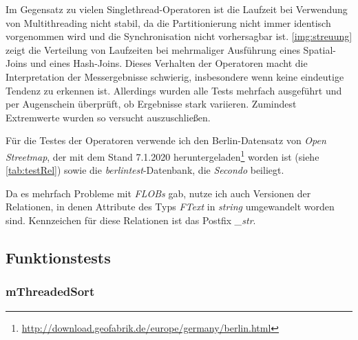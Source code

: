 \documentclass[a4paper,12pt,twoside]{article}
\newcommand{\Fb}[1]{\textit{#1}} %
\begin{document}
Im Gegensatz zu vielen Singlethread-Operatoren ist die Laufzeit bei Verwendung von Multithreading nicht stabil, da die Partitionierung nicht immer identisch vorgenommen wird und die Synchronisation nicht vorhersagbar ist. \autoref{img:streuung} zeigt die Verteilung von Laufzeiten bei mehrmaliger Ausführung eines Spatial-Joins und eines Hash-Joins. Dieses Verhalten der Operatoren macht die Interpretation der Messergebnisse schwierig, insbesondere wenn keine eindeutige Tendenz zu erkennen ist. Allerdings wurden alle Tests mehrfach ausgeführt und per Augenschein überprüft, ob Ergebnisse stark variieren. Zumindest Extremwerte wurden so versucht auszuschließen.  

Für die Testes der Operatoren verwende ich den Berlin-Datensatz von \Fb{Open Streetmap}, der mit dem Stand 7.1.2020 heruntergeladen\footnote{\url{http://download.geofabrik.de/europe/germany/berlin.html}} worden ist (siehe \autoref{tab:testRel}) sowie die \Fb{berlintest}-Datenbank, die \Fb{Secondo} beiliegt.

Da es mehrfach Probleme mit \Fb{FLOBs} gab, nutze ich auch Versionen der Relationen, in denen Attribute des Typs \Fb{FText} in \Fb{string} umgewandelt worden sind. Kennzeichen für diese Relationen ist das Postfix \Fb{\_str}.

\subsection{Funktionstests}

\subsubsection{mThreadedSort}
\end{document}
